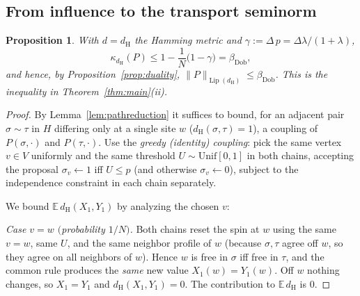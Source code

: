 \documentclass{amsart}
\newtheorem{proposition}{Proposition}
\DeclareMathOperator{\Lip}{Lip}
\newcommand{\E}{\mathbb{E}}
\begin{document}
\subsection{From influence to the transport seminorm}
\begin{proposition}\label{prop:dobrushin}
With $d=d_{\mathrm H}$ the Hamming metric and $\gamma:=\Delta\,p=\Delta\lambda/(1+\lambda)$,
\[
\kappa_{d_{\mathrm H}}(P)\le 1-\frac1N\big(1-\gamma\big)=\beta_{\mathrm{Dob}},
\]
and hence, by Proposition~\ref{prop:duality},
$\|P\|_{\Lip(d_{\mathrm H})}\le\beta_{\mathrm{Dob}}$. This is the inequality in
Theorem~\ref{thm:main}(ii).
\end{proposition}
\begin{proof}
By Lemma~\ref{lem:pathreduction} it suffices to bound, for an adjacent pair
$\sigma\sim\tau$ in $H$ differing only at a single site $w$
($d_{\mathrm H}(\sigma,\tau)=1$), a coupling of $P(\sigma,\cdot)$ and
$P(\tau,\cdot)$. Use the \emph{greedy (identity) coupling}: pick the same vertex
$v\in V$ uniformly and the same threshold $U\sim\mathrm{Unif}[0,1]$ in both
chains, accepting the proposal $\sigma_v\leftarrow1$ iff $U\le p$ (and otherwise
$\sigma_v\leftarrow0$), subject to the independence constraint in each chain
separately.

We bound $\E\,d_{\mathrm H}(X_1,Y_1)$ by analyzing the chosen $v$:

\smallskip
\noindent\emph{Case $v=w$ $($probability $1/N)$.} Both chains reset the spin at
$w$ using the same $v=w$, same $U$, and the same neighbor profile of $w$ (because
$\sigma,\tau$ agree off $w$, so they agree on all neighbors of $w$). Hence $w$ is
free in $\sigma$ iff free in $\tau$, and the common rule produces the
\emph{same} new value $X_1(w)=Y_1(w)$. Off $w$ nothing changes, so $X_1=Y_1$ and
$d_{\mathrm H}(X_1,Y_1)=0$. The contribution to $\E\,d_{\mathrm H}$ is $0$.


\end{proof}
\end{document}
